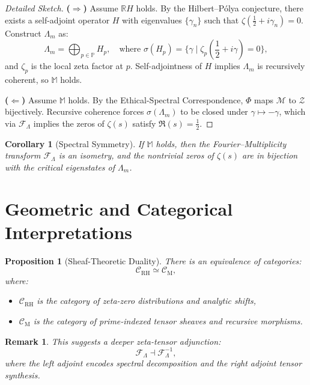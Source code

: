 \documentclass[12pt]{article}
\newtheorem{proposition}[theorem]{Proposition}
\newtheorem{corollary}[theorem]{Corollary}
\newtheorem{remark}[theorem]{Remark}
\begin{document}
\begin{proof}[Detailed Sketch]
\textbf{(\(\Rightarrow\))} Assume \(\mathbb{R}H\) holds. By the Hilbert--P\'olya conjecture, there exists a self-adjoint operator \(H\) with eigenvalues \(\{\gamma_n\}\) such that \(\zeta(\frac{1}{2} + i\gamma_n) = 0\). Construct \(\Lambda_m\) as:
\[
\Lambda_m = \bigoplus_{p \in \mathbb{P}} H_p, \quad \text{where } \sigma(H_p) = \{\gamma \mid \zeta_p(\frac{1}{2} + i\gamma) = 0\},
\]
and \(\zeta_p\) is the local zeta factor at \(p\). Self-adjointness of \(H\) implies \(\Lambda_m\) is recursively coherent, so \(\mathbb{M}\) holds.

\textbf{(\(\Leftarrow\))} Assume \(\mathbb{M}\) holds. By the Ethical-Spectral Correspondence, \(\Phi\) maps \(\mathscr{M}\) to \(\mathscr{Z}\) bijectively. Recursive coherence forces \(\sigma(\Lambda_m)\) to be closed under \(\gamma \mapsto -\gamma\), which via \(\mathscr{F}_\Lambda\) implies the zeros of \(\zeta(s)\) satisfy \(\Re(s) = \frac{1}{2}\).
\end{proof}

\begin{corollary}[Spectral Symmetry]
If \(\mathbb{M}\) holds, then the Fourier--Multiplicity transform \(\mathscr{F}_\Lambda\) is an isometry, and the nontrivial zeros of \(\zeta(s)\) are in bijection with the critical eigenstates of \(\Lambda_m\).
\end{corollary}

\section{Geometric and Categorical Interpretations}

\begin{proposition}[Sheaf-Theoretic Duality]
There is an equivalence of categories:
\[
\mathscr{C}_{\text{RH}} \simeq \mathscr{C}_{\text{M}},
\]
where:
\begin{itemize}
    \item \(\mathscr{C}_{\text{RH}}\) is the category of zeta-zero distributions and analytic shifts,
    \item \(\mathscr{C}_{\text{M}}\) is the category of prime-indexed tensor sheaves and recursive morphisms.
\end{itemize}
\end{proposition}

\begin{remark}
This suggests a deeper \textit{zeta-tensor adjunction}:
\[
\mathscr{F}_\Lambda \dashv \mathscr{F}_\Lambda^{-1},
\]
where the left adjoint encodes spectral decomposition and the right adjoint tensor synthesis.
\end{remark}
\end{document}
